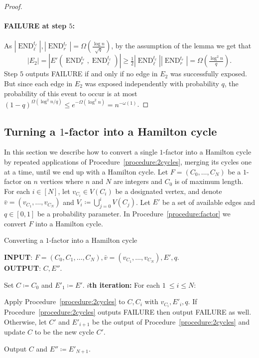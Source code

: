 \documentclass{article}
\DeclareMathOperator{\END}{END}
\begin{document}
\begin{proof}
		\paragraph*{FAILURE at step $5$:} As $\left|\END_{\ell}^{t_{\ell}} \right|, \left|\END_r^{t_r} \right| = \Omega\left(\frac{\log n}{\sqrt{q}} \right)$, by the assumption of the lemma we get that
		\[|E_2| = \left|E'\left(\END_r^{t_r}, \END_{\ell}^{t_{\ell}} \right) \right| \ge \tfrac{1}{2} \left|\END_{\ell}^{t_{\ell}} \right| \left|\END_r^{t_r} \right| =  \Omega\left(\tfrac{\log^2 n}{q} \right). \]
		Step $5$ outputs FAILURE if and only if no edge in $E_2$ was successfully exposed.
		But since each edge in $E_2$ was exposed independently with probability $q$, the probability of this event to occur is at most $(1-q)^{\Omega (\log^2 n / q)} \le e^{-\Omega (\log^2 n)} =n^{-\omega(1)}$.
	\end{proof}
	
	
	\subsection{\texorpdfstring{Turning a $1$-factor into a Hamilton cycle}{Turning a 1-factor into a Hamilton cycle}}
	
	In this section we describe how to convert a single $1$-factor into a Hamilton cycle by repeated applications of Procedure~\ref{procedure:2cycles}, merging its cycles one at a time, until we end up with a Hamilton cycle.
	Let $F=\left(C_0, \ldots, C_N \right)$ be a $1$-factor on $n$ vertices where $n$ and $N$ are integers and $C_0$ is of maximum length.
	For each $i \in [N]$, let $v_{C_i} \in V(C_i)$ be a designated vertex, and denote $\bar{v} = (v_{C_1}, \ldots, v_{C_N})$ and $V_i \coloneqq \bigcup_{j=0}^i V(C_j)$.
	Let $E'$ be a set of available edges and $q \in [0,1]$ be a probability parameter.
	In Procedure~\ref{procedure:factor} we convert $F$ into a Hamilton cycle.
	\begin{algorithm}
		\caption{Converting a $1$-factor into a Hamilton cycle}
		\label{procedure:factor}
		\textbf{INPUT}: $F = \left(C_0, C_1, \ldots, C_N \right), \bar{v} = (v_{C_1}, \ldots, v_{C_N}), E', q$. \\
		\textbf{OUTPUT}: $C, E''$.
		\begin{algorithmic}[1]
			\STATE Set $C \coloneqq C_0$ and $E'_1 \coloneqq E'$.
			\STATE \textbf{$i$th iteration:} For each $1\ \le i \le N$:
			\begin{ALC@g}
				\STATE Apply Procedure~\ref{procedure:2cycles} to $C, C_i$ with $v_{C_i}, E'_i, q$.
				\STATE If Procedure~\ref{procedure:2cycles} outputs FAILURE then output FAILURE as well.
				Otherwise, let $C'$ and $E'_{i+1}$ be the output of Procedure~\ref{procedure:2cycles} and update $C$ to be the new cycle $C'$.
			\end{ALC@g}
			\STATE Output $C$ and $E'' \coloneqq E'_{N+1}$.
		\end{algorithmic}
	\end{algorithm}
	
\end{document}
